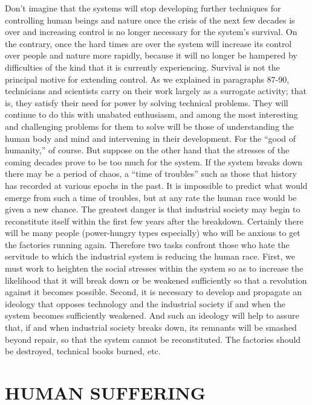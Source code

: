  Don’t imagine that the systems will stop developing further techniques for controlling human beings and nature once the crisis of the next few decades is over and increasing control is no longer necessary for the system’s survival. On the contrary, once the hard times are over the system will increase its control over people and nature more rapidly, because it will no longer be hampered by difficulties of the kind that it is currently experiencing. Survival is not the principal motive for extending control. As we explained in paragraphs 87-90, technicians and scientists carry on their work largely as a surrogate activity; that is, they satisfy their need for power by solving technical problems. They will continue to do this with unabated enthusiasm, and among the most interesting and challenging problems for them to solve will be those of understanding the human body and mind and intervening in their development. For the “good of humanity,” of course.
 But suppose on the other hand that the stresses of the coming decades prove to be too much for the system. If the system breaks down there may be a period of chaos, a “time of troubles” such as those that history has recorded at various epochs in the past. It is impossible to predict what would emerge from such a time of troubles, but at any rate the human race would be given a new chance. The greatest danger is that industrial society may begin to reconstitute itself within the first few years after the breakdown. Certainly there will be many people (power-hungry types especially) who will be anxious to get the factories running again.
 Therefore two tasks confront those who hate the servitude to which the industrial system is reducing the human race. First, we must work to heighten the social stresses within the system so as to increase the likelihood that it will break down or be weakened sufficiently so that a revolution against it becomes possible. Second, it is necessary to develop and propagate an ideology that opposes technology and the industrial society if and when the system becomes sufficiently weakened. And such an ideology will help to assure that, if and when industrial society breaks down, its remnants will be smashed beyond repair, so that the system cannot be reconstituted. The factories should be destroyed, technical books burned, etc.

\chapter{HUMAN SUFFERING}

